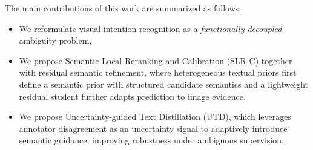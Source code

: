 The main contributions of this work are summarized as follows:
\begin{itemize}
    \item We reformulate visual intention recognition as a \emph{functionally decoupled} ambiguity problem, 
    \item We propose Semantic Local Reranking and Calibration (SLR-C) together with residual semantic refinement, where heterogeneous textual priors first define a semantic prior with structured candidate semantics and a lightweight residual student further adapts prediction to image evidence.
    \item We propose Uncertainty-guided Text Distillation (UTD), which leverages annotator disagreement as an uncertainty signal to adaptively introduce semantic guidance, improving robustness under ambiguous supervision.
\end{itemize}

